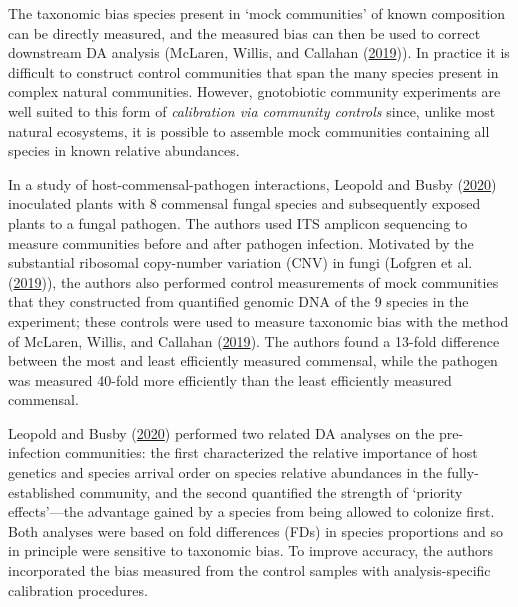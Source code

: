 \documentclass[
]{article}
\begin{document}
The taxonomic bias species present in `mock communities' of known composition can be directly measured, and the measured bias can then be used to correct downstream DA analysis (McLaren, Willis, and Callahan (\protect\hyperlink{ref-mclaren2019cons}{2019})).
In practice it is difficult to construct control communities that span the many species present in complex natural communities.
However, gnotobiotic community experiments are well suited to this form of \emph{calibration via community controls} since, unlike most natural ecosystems, it is possible to assemble mock communities containing all species in known relative abundances.

In a study of host-commensal-pathogen interactions, Leopold and Busby (\protect\hyperlink{ref-leopold2020host}{2020}) inoculated plants with 8 commensal fungal species and subsequently exposed plants to a fungal pathogen.
The authors used ITS amplicon sequencing to measure communities before and after pathogen infection.
Motivated by the substantial ribosomal copy-number variation (CNV) in fungi (Lofgren et al. (\protect\hyperlink{ref-lofgren2019geno}{2019})), the authors also performed control measurements of mock communities that they constructed from quantified genomic DNA of the 9 species in the experiment; these controls were used to measure taxonomic bias with the method of McLaren, Willis, and Callahan (\protect\hyperlink{ref-mclaren2019cons}{2019}).
The authors found a 13-fold difference between the most and least efficiently measured commensal, while the pathogen was measured 40-fold more efficiently than the least efficiently measured commensal.

Leopold and Busby (\protect\hyperlink{ref-leopold2020host}{2020}) performed two related DA analyses on the pre-infection communities: the first characterized the relative importance of host genetics and species arrival order on species relative abundances in the fully-established community, and the second quantified the strength of `priority effects'---the advantage gained by a species from being allowed to colonize first.
Both analyses were based on fold differences (FDs) in species proportions and so in principle were sensitive to taxonomic bias.
To improve accuracy, the authors incorporated the bias measured from the control samples with analysis-specific calibration procedures.
\end{document}
